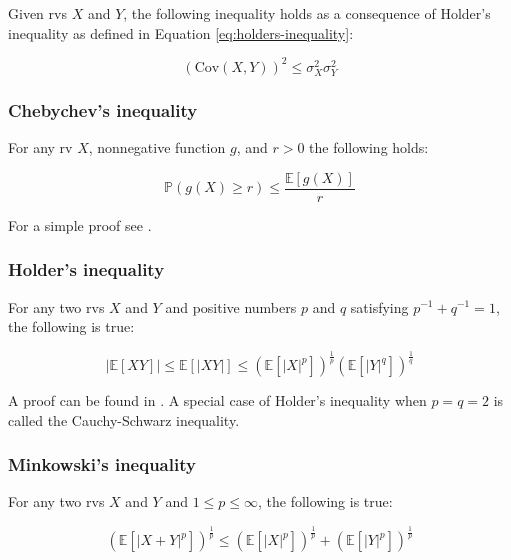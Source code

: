 \documentclass{report}
\begin{document}
Given \glspl{rv} $X$ and $Y$, the following inequality holds as a consequence of Holder's inequality as defined in Equation \ref{eq:holders-inequality}:

\begin{equation}\label{eq:covariance-inequality}
    \left(\text{Cov}(X,Y)\right)^2 \leq \sigma^2_X\sigma^2_Y
\end{equation}

\subsubsection{Chebychev's inequality}

For any \gls{rv} $X$, nonnegative function $g$, and $r > 0$ the following holds:

\begin{equation}\label{eq:chebychevs-inequality}
    \mathbb{P}(g(X) \geq r) \leq \frac{\mathbb{E}[g(X)]}{r}
\end{equation}

For a simple proof see \cite[Chapter~3.6.1]{casella_statistical_2002}. 

\subsubsection{Holder's inequality}

For any two \glspl{rv} $X$ and $Y$ and positive numbers $p$ and $q$ satisfying $p^{-1} + q^{-1} = 1$, the following is true:

\begin{equation}\label{eq:holders-inequality}
    |\mathbb{E}[XY]| \leq \mathbb{E}[|XY|] \leq \left(\mathbb{E}[|X|^p]\right)^{\frac{1}{p}}\left(\mathbb{E}[|Y|^q]\right)^{\frac{1}{q}}
\end{equation}

A proof can be found in \cite[Chapter~4.7.1]{casella_statistical_2002}. A special case of Holder's inequality when $p = q = 2$ is called the Cauchy-Schwarz inequality. 

\subsubsection{Minkowski's inequality}

For any two \glspl{rv} $X$ and $Y$ and $1 \leq p \leq \infty$, the following is true:

\begin{equation}\label{eq:minkowskis-inequality}
    \left(\mathbb{E}[|X + Y|^p]\right)^{\frac{1}{p}} \leq \left(\mathbb{E}[|X|^p]\right)^{\frac{1}{p}} + \left(\mathbb{E}[|Y|^p]\right)^{\frac{1}{p}}
\end{equation}
\end{document}
